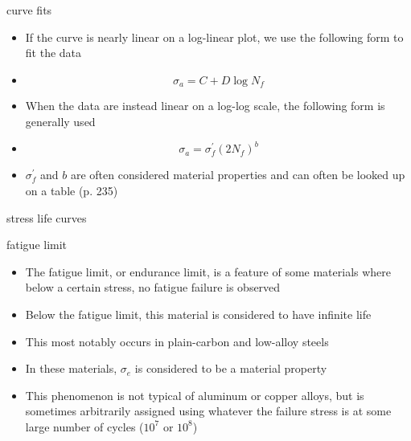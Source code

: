 \documentclass[10pt]{beamer}
\begin{document}
\begin{frame}{curve fits}
	\begin{itemize}[<+->]
		\item If the curve is nearly linear on a log-linear plot, we use the following form to fit the data
		\item \begin{equation}
		\sigma_a = C + D \log N_f
		\end{equation}
		\item When the data are instead linear on a log-log scale, the following form is generally used
		\item \begin{equation}
		\sigma_a = \sigma_f^\prime \left(2N_f\right)^b
		\end{equation}
		\item $\sigma_f^\prime$ and $b$ are often considered material properties and can often be looked up on a table (p. 235)
	\end{itemize}
\end{frame}

\begin{frame}{stress life curves}
\end{frame}

\begin{frame}{fatigue limit}
	\begin{itemize}[<+->]
		\item The fatigue limit, or endurance limit, is a feature of some materials where below a certain stress, no fatigue failure is observed
		\item Below the fatigue limit, this material is considered to have infinite life
		\item This most notably occurs in plain-carbon and low-alloy steels
		\item In these materials, $\sigma_e$ is considered to be a material property
		\item This phenomenon is not typical of aluminum or copper alloys, but is sometimes arbitrarily assigned using whatever the failure stress is at some large number of cycles ($10^7$ or $10^8$)
	\end{itemize}
\end{frame}
\end{document}
